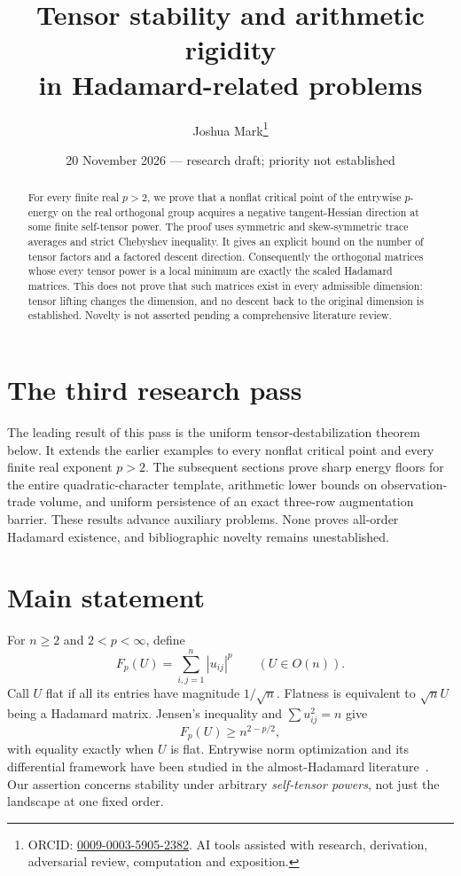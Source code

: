 \documentclass[11pt]{article}
\title{Tensor stability and arithmetic rigidity\\in Hadamard-related problems}
\author{Joshua Mark\thanks{ORCID: \href{https://orcid.org/0009-0003-5905-2382}{0009-0003-5905-2382}. AI tools assisted with research, derivation, adversarial review, computation and exposition.}}
\date{20 November 2026 --- research draft; priority not established}
\begin{document}
\maketitle
\begin{abstract}
For every finite real $p>2$, we prove that a nonflat critical point of
the entrywise $p$-energy on the real orthogonal group acquires a negative
tangent-Hessian direction at some finite self-tensor power. The proof
uses symmetric and skew-symmetric trace averages and strict Chebyshev
inequality. It gives an explicit bound on the number of tensor factors
and a factored descent direction. Consequently the orthogonal matrices
whose every tensor power is a local minimum are exactly the scaled
Hadamard matrices. This does not prove that such matrices exist in
every admissible dimension: tensor lifting changes the dimension, and
no descent back to the original dimension is established. Novelty is
not asserted pending a comprehensive literature review.
\end{abstract}

\section*{The third research pass}
The leading result of this pass is the uniform tensor-destabilization
theorem below. It extends the earlier examples to every nonflat
critical point and every finite real exponent $p>2$. The subsequent
sections prove sharp energy floors for the entire quadratic-character
template, arithmetic lower bounds on observation-trade volume, and
uniform persistence of an exact three-row augmentation barrier.
These results advance auxiliary problems. None proves all-order
Hadamard existence, and bibliographic novelty remains unestablished.


\section{Main statement}
For $n\ge2$ and $2<p<\infty$, define
\[
 F_p(U)=\sum_{i,j=1}^n |u_{ij}|^p\qquad(U\in O(n)).
\]
Call $U$ flat if all its entries have magnitude $1/\sqrt n$.
Flatness is equivalent to $\sqrt nU$ being a Hadamard matrix.
Jensen's inequality and $\sum u_{ij}^2=n$ give
\[
 F_p(U)\ge n^{2-p/2},
\]
with equality exactly when $U$ is flat. Entrywise norm optimization
and its differential framework have been studied in the almost-Hadamard
literature~\cite{BN}. Our assertion concerns stability under arbitrary
\emph{self-tensor powers}, not just the landscape at one fixed order.
\end{document}
